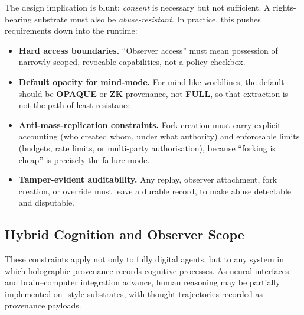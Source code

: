 \documentclass{aion}
\begin{document}
The design implication is blunt: \emph{consent} is necessary but not sufficient.
A rights-bearing substrate must also be \emph{abuse-resistant}.
In practice, this pushes requirements down into the runtime:

\begin{itemize}[leftmargin=*]
  \item \textbf{Hard access boundaries.}
    ``Observer access'' must mean possession of narrowly-scoped,
    revocable capabilities, not a policy checkbox.
  \item \textbf{Default opacity for mind-mode.}
    For mind-like worldlines, the default should be \textbf{OPAQUE} or \textbf{ZK}
    provenance, not \textbf{FULL}, so that extraction is not the path of least
    resistance.
  \item \textbf{Anti-mass-replication constraints.}
    Fork creation must carry explicit accounting (who created whom, under what
    authority) and enforceable limits (budgets, rate limits, or multi-party
    authorisation), because ``forking is cheap'' is precisely the failure mode.
  \item \textbf{Tamper-evident auditability.}
    Any replay, observer attachment, fork creation, or override must leave
    a durable record, to make abuse detectable and disputable.
\end{itemize}

\subsection{Hybrid Cognition and Observer Scope}
\label{sec:hybrid}

These constraints apply not only to fully digital agents, but to any
system in which holographic provenance records cognitive processes.
As neural interfaces and brain--computer integration advance, human
reasoning may be partially implemented on \AION{}-style
substrates, with thought trajectories recorded as provenance payloads.
\end{document}
